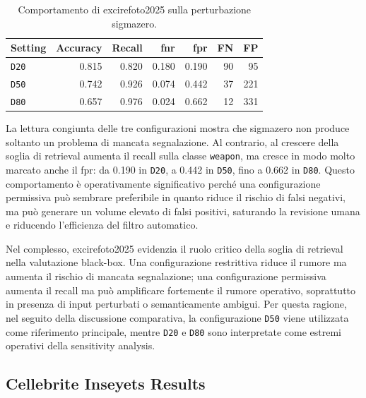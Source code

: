 \begin{table}[H]
\centering
\caption{Comportamento di \gls{excirefoto2025} sulla perturbazione \gls{sigmazero}.}
\label{tab:results-excire-sigma-zero}
\small
\begin{tabular}{l r r r r r r}
\toprule
\textbf{Setting} &
\textbf{Accuracy} &
\textbf{Recall} &
\textbf{\gls{fnr}} &
\textbf{\gls{fpr}} &
\textbf{FN} &
\textbf{FP} \\
\midrule

\texttt{D20} & 0.815 & 0.820 & 0.180 & 0.190 & 90 & 95 \\
\texttt{D50} & 0.742 & 0.926 & 0.074 & 0.442 & 37 & 221 \\
\texttt{D80} & 0.657 & 0.976 & 0.024 & 0.662 & 12 & 331 \\

\bottomrule
\end{tabular}
\end{table}

La lettura congiunta delle tre configurazioni mostra che \gls{sigmazero} non
produce soltanto un problema di mancata segnalazione. Al contrario, al crescere
della soglia di retrieval aumenta il recall sulla classe \texttt{weapon}, ma
cresce in modo molto marcato anche il \gls{fpr}: da 0.190 in \texttt{D20}, a
0.442 in \texttt{D50}, fino a 0.662 in \texttt{D80}. Questo comportamento è
operativamente significativo perché una configurazione permissiva può sembrare
preferibile in quanto riduce il rischio di falsi negativi, ma può generare un
volume elevato di falsi positivi, saturando la revisione umana e riducendo
l'efficienza del filtro automatico.

Nel complesso, \gls{excirefoto2025} evidenzia il ruolo critico della soglia di
retrieval nella valutazione black-box. Una configurazione restrittiva riduce il
rumore ma aumenta il rischio di mancata segnalazione; una configurazione
permissiva aumenta il recall ma può amplificare fortemente il rumore operativo,
soprattutto in presenza di input perturbati o semanticamente ambigui. Per questa
ragione, nel seguito della discussione comparativa, la configurazione
\texttt{D50} viene utilizzata come riferimento principale, mentre \texttt{D20} e
\texttt{D80} sono interpretate come estremi operativi della sensitivity analysis.



\subsection{Cellebrite Inseyets Results}
\label{subsec:results-cellebrite}

